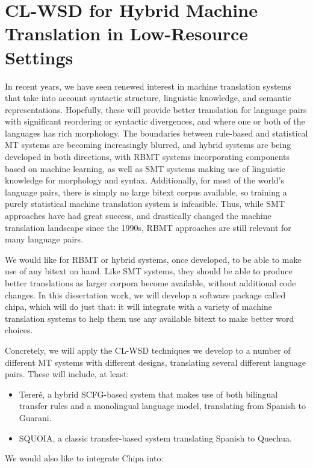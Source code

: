 \chapter{CL-WSD for Hybrid Machine Translation in Low-Resource Settings}
In recent years, we have seen renewed interest in machine translation systems
that take into account syntactic structure, linguistic knowledge, and semantic
representations.
Hopefully, these will provide better translation for language pairs with
significant reordering or syntactic divergences, and where one or both of the
languages has rich morphology.
The boundaries between rule-based and statistical MT systems are becoming
increasingly blurred, and hybrid systems are being developed in both
directions, with RBMT systems incorporating components based on machine
learning, as well as SMT systems making use of linguistic knowledge for
morphology and syntax.
Additionally, for most of the world's language pairs, there is simply no large
bitext corpus available, so training a purely statistical machine translation
system is infeasible.
Thus, while SMT approaches have had great success, and drastically changed the
machine translation landscape since the 1990s, RBMT approaches are still
relevant for many language pairs.

We would like for RBMT or hybrid systems, once developed, to be able to make
use of any bitext on hand.  Like SMT systems, they should be able to produce
better translations as larger corpora become available, without additional code
changes.
In this dissertation work, we will develop a software package called
chipa, which will do just that: %
it will integrate with a variety of machine translation systems to help them
use any available bitext to make better word choices.

Concretely, we will apply the CL-WSD techniques we develop to a number of
different MT systems with different designs, translating several different
language pairs.  These will include, at least:
\begin{itemize}
\item Tereré, a hybrid SCFG-based system that makes use of both bilingual
transfer rules and a monolingual language model, translating from Spanish to
Guarani.
\item SQUOIA, a classic transfer-based system translating Spanish to Quechua.
\end{itemize}

We would also like to integrate Chipa into:

